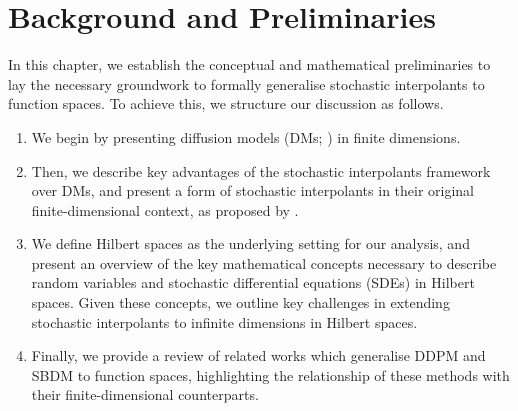 
\chapter{Background and Preliminaries}\label{cha:2}

\ifpdf
\graphicspath{{Chapter2/Figs/Raster/}{Chapter2/Figs/PDF/}{Chapter2/Figs/}}
\else
\graphicspath{{Chapter2/Figs/Vector/}{Chapter2/Figs/}}
\fi

In this chapter, we establish the conceptual and mathematical preliminaries to lay the necessary groundwork to formally generalise stochastic interpolants to function spaces. To achieve this, we structure our discussion as follows.

\begin{enumerate}
  \item We begin by presenting diffusion models (DMs; \citealp{song2021scorebasedgenerativemodelingstochastic}) in finite dimensions.
  \item Then, we describe key advantages of the stochastic interpolants framework over DMs, and present a form of stochastic interpolants in their original finite-dimensional context, as proposed by \citet{albergo2023stochasticinterpolantsunifyingframework}.
  \item We define Hilbert spaces as the underlying setting for our analysis, and present an overview of the key mathematical concepts necessary to describe random variables and stochastic differential equations (SDEs) in Hilbert spaces. Given these concepts, we outline key challenges in extending stochastic interpolants to infinite dimensions in Hilbert spaces.
  \item Finally, we provide a review of related works which generalise DDPM and SBDM to function spaces, highlighting the relationship of these methods with their finite-dimensional counterparts.
\end{enumerate}

